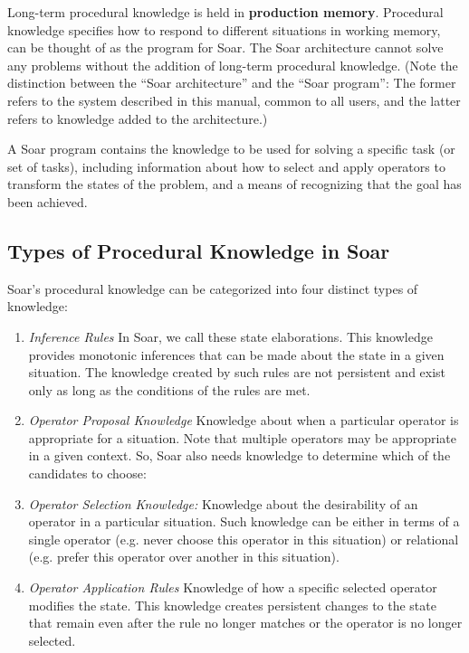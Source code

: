 Long-term procedural knowledge is held in \textbf{production memory}. Procedural knowledge specifies how to respond to different
situations in working memory, can be thought of as the program for Soar. The Soar architecture cannot solve any problems without the addition of long-term procedural knowledge.  (Note the distinction between the ``Soar architecture'' and the ``Soar program'': The former refers to the system described in this manual, common to all users, and the latter refers to knowledge added to the architecture.)

A Soar program contains the knowledge to be used for solving a specific task (or set of tasks), including information about how to select and apply operators to transform the states of the problem, and a means of recognizing that the goal has been achieved.

\subsection{Types of Procedural Knowledge in Soar}
\label{LIST:4KnowledgeTypes}

Soar's procedural knowledge can be categorized into  four distinct types of knowledge:

\vspace{-10pt}
\begin{enumerate}
	\item \textit{Inference Rules} \newline
		In Soar, we call these state elaborations. This knowledge provides monotonic inferences that can be made about the state in a given situation. The knowledge created by such rules are not persistent and exist only as long as the conditions of the rules are met.
	\vspace{-6pt}
	\item \textit{Operator Proposal Knowledge} \newline
		Knowledge about when a particular operator is appropriate for a situation. Note that multiple operators may be appropriate in a given context. So, Soar also needs knowledge to determine which of the candidates to choose:
		\vspace{-6pt}
	\item \textit{Operator Selection Knowledge:} \newline
		Knowledge about the desirability of an operator in a particular situation. Such knowledge can be either in terms of a single operator (e.g. never choose this operator in this situation) or relational (e.g. prefer this operator over another in this situation).
		\vspace{-6pt}
	\item \textit{Operator Application Rules} \newline
		Knowledge of how a specific selected operator modifies the state. This knowledge creates persistent changes to the state that remain even after the rule no longer matches or the operator is no longer selected.
		\vspace{-6pt}
\end{enumerate}

